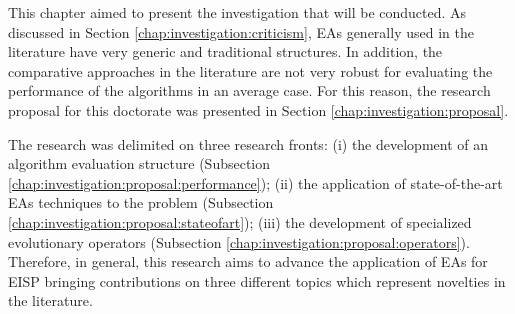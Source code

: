 		This chapter aimed to present the investigation that will be conducted. As discussed in Section \ref{chap:investigation:criticism}, EAs generally used in the literature have very generic and traditional structures. In addition, the comparative approaches in the literature are not very robust for evaluating the performance of the algorithms in an average case. For this reason, the research proposal for this doctorate was presented in Section \ref{chap:investigation:proposal}.
		
		The research was delimited on three research fronts: (i) the development of an algorithm evaluation structure (Subsection \ref{chap:investigation:proposal:performance}); (ii) the application of state-of-the-art EAs techniques to the problem (Subsection \ref{chap:investigation:proposal:stateofart}); (iii) the development of specialized evolutionary operators (Subsection \ref{chap:investigation:proposal:operators}). Therefore, in general, this research aims to advance the application of EAs for EISP bringing contributions on three different topics which represent novelties in the literature.
		

